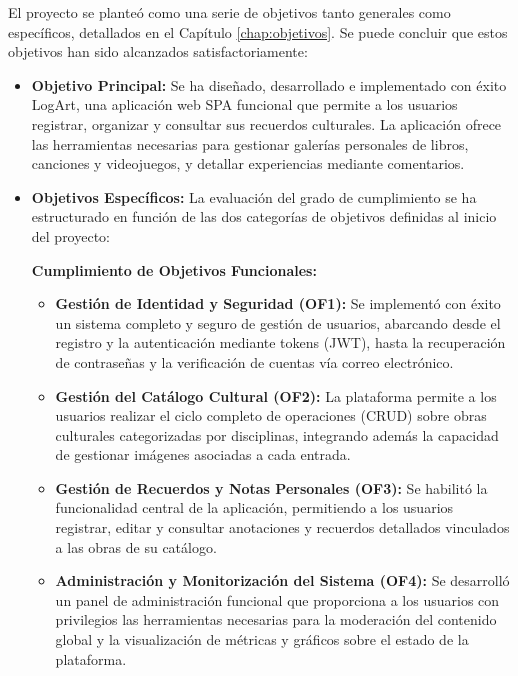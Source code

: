 El proyecto se planteó como una serie de objetivos tanto generales como específicos, detallados en el Capítulo \ref{chap:objetivos}. Se puede concluir que estos objetivos han sido alcanzados satisfactoriamente:
\begin{itemize}
    \item \textbf{Objetivo Principal:} Se ha diseñado, desarrollado e implementado con éxito LogArt, una aplicación web SPA funcional que permite a los usuarios registrar, organizar y consultar sus recuerdos culturales. La aplicación ofrece las herramientas necesarias para gestionar galerías personales de libros, canciones y videojuegos, y detallar experiencias mediante comentarios.
    \item \textbf{Objetivos Específicos:}
    La evaluación del grado de cumplimiento se ha estructurado en función de las dos categorías de objetivos definidas al inicio del proyecto:

    \vspace{0.2cm}
    \textbf{Cumplimiento de Objetivos Funcionales:}
    \begin{itemize}
        \item \textbf{Gestión de Identidad y Seguridad (OF1):} Se implementó con éxito un sistema completo y seguro de gestión de usuarios, abarcando desde el registro y la autenticación mediante tokens (JWT), hasta la recuperación de contraseñas y la verificación de cuentas vía correo electrónico.
        \item \textbf{Gestión del Catálogo Cultural (OF2):} La plataforma permite a los usuarios realizar el ciclo completo de operaciones (CRUD) sobre obras culturales categorizadas por disciplinas, integrando además la capacidad de gestionar imágenes asociadas a cada entrada.
        \item \textbf{Gestión de Recuerdos y Notas Personales (OF3):} Se habilitó la funcionalidad central de la aplicación, permitiendo a los usuarios registrar, editar y consultar anotaciones y recuerdos detallados vinculados a las obras de su catálogo.
        \item \textbf{Administración y Monitorización del Sistema (OF4):} Se desarrolló un panel de administración funcional que proporciona a los usuarios con privilegios las herramientas necesarias para la moderación del contenido global y la visualización de métricas y gráficos sobre el estado de la plataforma.
    \end{itemize}


\end{itemize}
